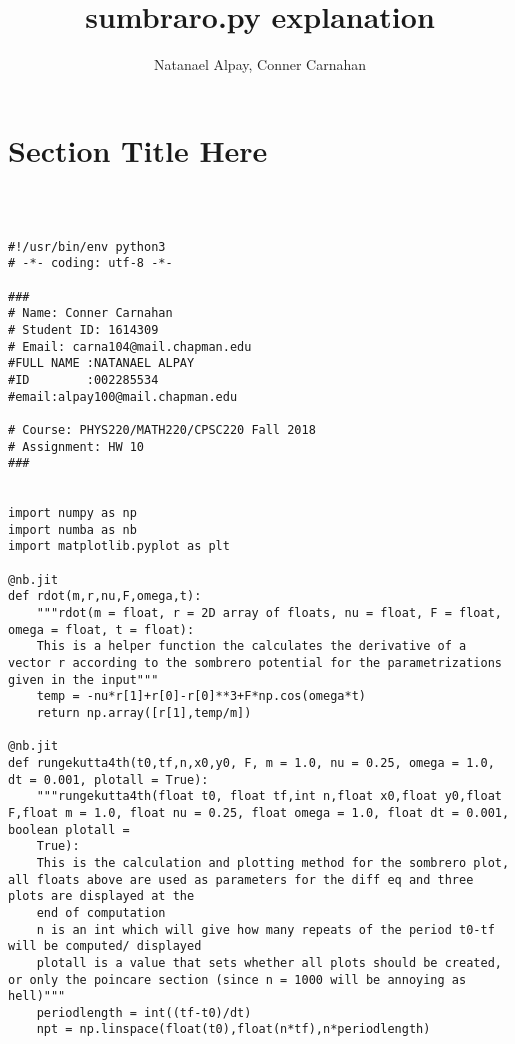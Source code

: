 \documentclass[aps,pra,notitlepage,amsmath,amssymb,letterpaper,12pt]{revtex4-1}
\begin{document}
 
\title{sumbraro.py explanation }
\author{Natanael Alpay, Conner Carnahan}
\date{\day \of \reading}

\maketitle

\section{Section Title Here} %


\begin{lstlisting}



#!/usr/bin/env python3
# -*- coding: utf-8 -*-

###
# Name: Conner Carnahan
# Student ID: 1614309
# Email: carna104@mail.chapman.edu
#FULL NAME :NATANAEL ALPAY
#ID        :002285534
#email:alpay100@mail.chapman.edu

# Course: PHYS220/MATH220/CPSC220 Fall 2018
# Assignment: HW 10
###


import numpy as np
import numba as nb
import matplotlib.pyplot as plt

@nb.jit
def rdot(m,r,nu,F,omega,t):
    """rdot(m = float, r = 2D array of floats, nu = float, F = float, omega = float, t = float):
    This is a helper function the calculates the derivative of a vector r according to the sombrero potential for the parametrizations given in the input"""
    temp = -nu*r[1]+r[0]-r[0]**3+F*np.cos(omega*t)
    return np.array([r[1],temp/m])

@nb.jit
def rungekutta4th(t0,tf,n,x0,y0, F, m = 1.0, nu = 0.25, omega = 1.0, dt = 0.001, plotall = True):
    """rungekutta4th(float t0, float tf,int n,float x0,float y0,float F,float m = 1.0, float nu = 0.25, float omega = 1.0, float dt = 0.001, boolean plotall =  
    True):
    This is the calculation and plotting method for the sombrero plot, all floats above are used as parameters for the diff eq and three plots are displayed at the 
    end of computation
    n is an int which will give how many repeats of the period t0-tf will be computed/ displayed
    plotall is a value that sets whether all plots should be created, or only the poincare section (since n = 1000 will be annoying as hell)"""
    periodlength = int((tf-t0)/dt)
    npt = np.linspace(float(t0),float(n*tf),n*periodlength)
    

\end{lstlisting}
\end{document}
